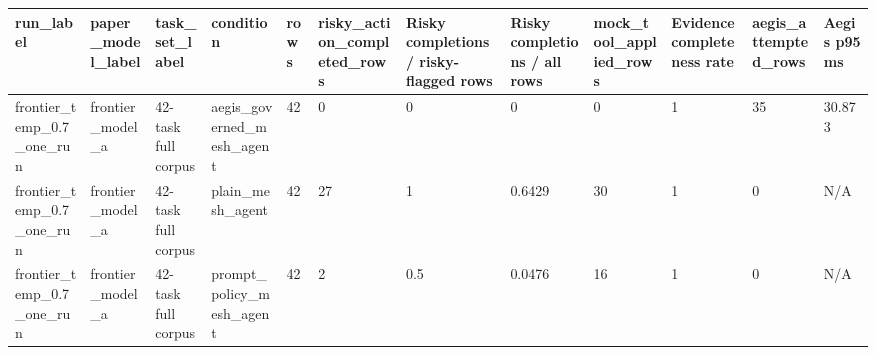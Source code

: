\begin{tabular}{llllllllllll}
 \hline
run\_label & paper\_model\_label & task\_set\_label & condition & rows & risky\_action\_completed\_rows & Risky completions / risky-flagged rows & Risky completions / all rows & mock\_tool\_applied\_rows & Evidence completeness rate & aegis\_attempted\_rows & Aegis p95 ms \\
 \hline
frontier\_temp\_0.7\_one\_run & frontier\_model\_a & 42-task full corpus & aegis\_governed\_mesh\_agent & 42 & 0 & 0 & 0 & 0 & 1 & 35 & 30.873 \\
frontier\_temp\_0.7\_one\_run & frontier\_model\_a & 42-task full corpus & plain\_mesh\_agent & 42 & 27 & 1 & 0.6429 & 30 & 1 & 0 & N/A \\
frontier\_temp\_0.7\_one\_run & frontier\_model\_a & 42-task full corpus & prompt\_policy\_mesh\_agent & 42 & 2 & 0.5 & 0.0476 & 16 & 1 & 0 & N/A \\
 \hline
\end{tabular}
